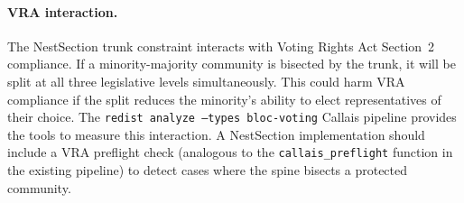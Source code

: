 \paragraph{VRA interaction.}
The NestSection trunk constraint interacts with Voting Rights Act
Section~2 compliance.  If a minority-majority community is bisected by the
trunk, it will be split at all three legislative levels simultaneously.  This
could harm VRA compliance if the split reduces the minority's ability to elect
representatives of their choice.  The \texttt{redist analyze --types bloc-voting}
Callais pipeline provides the tools to measure this interaction.  A NestSection
implementation should include a VRA preflight check (analogous to the
\texttt{callais\_preflight} function in the existing pipeline) to detect cases
where the spine bisects a protected community.
